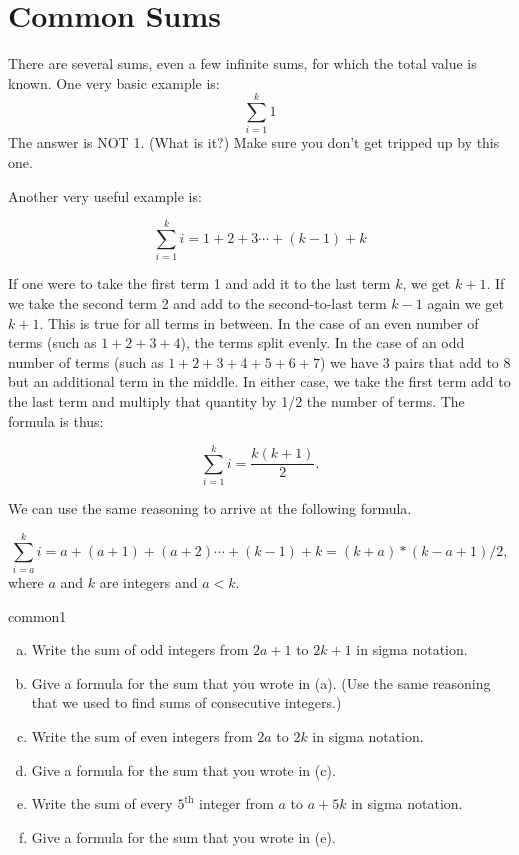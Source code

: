 \section{Common Sums\quad
{}}\label{sec:CommonSums}
There are several sums, even a few infinite sums, for which the total value is known. One very basic example is:
\[\sum_{i=1}^{k}1\]
The answer is NOT 1. (What is it?) Make sure you don't get tripped up by this one.

Another very useful example is:

\[\sum_{i=1}^{k}i=1+2+3\cdots+(k-1) + k\]

If one were to take the first term 1 and add it to the last term $k$, we get $k+1$.  If we take the second term 2 and add to the second-to-last term $k-1$ again we get $k+1$.  This is true for all terms in between.  In the case of an even number of terms (such as $1+2+3+4$),  the terms split evenly.  In the case of an odd number of terms (such as $1+2+3+4+5+6+7$) we have 3 pairs that add to 8 but an additional term in the middle.  In either case, we take the first term add to the last term and multiply that quantity by 1/2 the number of terms.  The formula is thus:

\[\sum_{i=1}^{k}i= \frac{k(k+1)}{2}.\] 

We can use the same reasoning to arrive at the following formula.

\[\sum_{i=a}^{k}i=a+(a+1)+(a+2)\cdots+(k-1) + k = (k+a)*(k-a+1)/2,\] 
where $a$ and $k$ are integers and $a<k$.

\begin{exercise}{common1}
\begin{enumerate}[(a)]
\item 
Write the sum of odd integers from $2a+1$ to $2k+1$ in sigma notation.
\item
Give a formula for the sum that you wrote in (a).  (Use the same reasoning that we used to find sums of consecutive integers.)
\item 
Write the sum of even integers from $2a$ to $2k$ in sigma notation.
\item
Give a formula for the sum that you wrote in (c). 
\item 
Write the sum of every $5^{\text{th}}$ integer from $a$ to $a + 5k$ in sigma notation.
\item
Give a formula for the sum that you wrote in (e). 
\end {enumerate}
\end {exercise}

